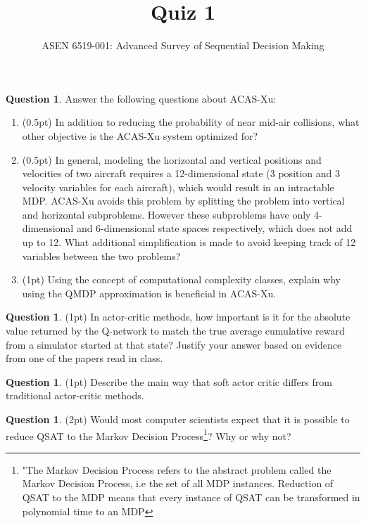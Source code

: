 \documentclass{article}
\title{Quiz 1}
\author{ASEN 6519-001: Advanced Survey of Sequential Decision Making}
\theoremstyle{definition}
\newtheorem{question}[thm]{Question}
\begin{document}
\maketitle

\begin{question}
    Answer the following questions about ACAS-Xu:
    \begin{enumerate}[label=\alph*)]
        \item (0.5pt) In addition to reducing the probability of near mid-air collisions, what other objective is the ACAS-Xu system optimized for?
        \item (0.5pt) In general, modeling the horizontal and vertical positions and velocities of two aircraft requires a 12-dimensional state (3 position and 3 velocity variables for each aircraft), which would result in an intractable MDP. ACAS-Xu avoids this problem by splitting the problem into vertical and horizontal subproblems. However these subproblems have only 4-dimensional and 6-dimensional state spaces respectively, which does not add up to 12. What additional simplification is made to avoid keeping track of 12 variables between the two problems?
        \item (1pt) Using the concept of computational complexity classes, explain why using the QMDP approximation is beneficial in ACAS-Xu.
    \end{enumerate}
\end{question}

\begin{question}
    (1pt) In actor-critic methods, how important is it for the absolute value returned by the Q-network to match the true average cumulative reward from a simulator started at that state? Justify your answer based on evidence from one of the papers read in class.
\end{question}

\begin{question}
    (1pt) Describe the main way that soft actor critic differs from traditional actor-critic methods.
\end{question}

\begin{question}
    (2pt) Would most computer scientists expect that it is possible to reduce QSAT to the Markov Decision Process\footnote{"The Markov Decision Process refers to the abstract problem called the Markov Decision Process, i.e the set of all MDP instances. Reduction of QSAT to the MDP means that every instance of QSAT can be transformed in polynomial time to an MDP}? Why or why not?
\end{question}
\end{document}
